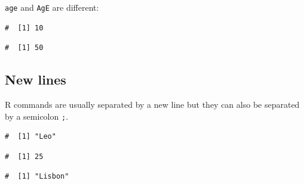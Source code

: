 \documentclass[a4paper,9pt,twocolumn,twoside,printwatermark=false]{pinp}
\begin{document}
\texttt{age} and \texttt{AgE} are different:

\begin{Shaded}
\begin{Highlighting}[]
\StringTok{ }
\StringTok{ }
\end{Highlighting}
\end{Shaded}

\begin{Shaded}
\begin{Highlighting}[]
\end{Highlighting}
\end{Shaded}

\begin{ShadedResult}
\begin{verbatim}
#  [1] 10
\end{verbatim}
\end{ShadedResult}

\begin{Shaded}
\begin{Highlighting}[]
\end{Highlighting}
\end{Shaded}

\begin{ShadedResult}
\begin{verbatim}
#  [1] 50
\end{verbatim}
\end{ShadedResult}

\subsection{New lines}\label{new-lines}

R commands are usually separated by a new line but they can also be
separated by a semicolon \texttt{;}.

\begin{Shaded}
\begin{Highlighting}[]
\StringTok{ }
\end{Highlighting}
\end{Shaded}

\begin{ShadedResult}
\begin{verbatim}
#  [1] "Leo"
\end{verbatim}
\end{ShadedResult}\begin{ShadedResult}
\begin{verbatim}
#  [1] 25
\end{verbatim}
\end{ShadedResult}\begin{ShadedResult}
\begin{verbatim}
#  [1] "Lisbon"
\end{verbatim}
\end{ShadedResult}
\end{document}
